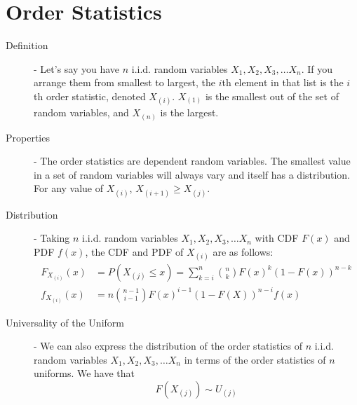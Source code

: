 \documentclass[11pt]{article}
\theoremstyle{definition}
\theoremstyle{remark}
\begin{document}
\section{Order Statistics}
\begin{description}
	\item[Definition] - Let's say you have $n$ i.i.d. random variables $X_1, X_2, X_3, \dots X_n$. If you arrange them from smallest to largest, the $i$th element in that list is the $i$th order statistic, denoted $X_{(i)}$. $X_{(1)}$ is the smallest out of the set of random variables, and $X_{(n)}$ is the largest.
	\item[Properties] - The order statistics are dependent random variables. The smallest value in a set of random variables will always vary and itself has a distribution. For any value of $X_{(i)}$, $X_{(i+1)} \geq X_{(j)}$.
	\item[Distribution] - Taking $n$ i.i.d. random variables $X_1, X_2, X_3, \dots X_n$ with CDF $F(x)$ and PDF $f(x)$, the CDF and PDF of $X_{(i)}$ are as follows:
	\begin{align*}
		F_{X_{(i)}}(x) &= P (X_{(j)} \leq x) = \sum_{k=i}^n {n \choose k} F(x)^k(1 - F(x))^{n - k} \\
		f_{X_{(i)}}(x) &= n{n - 1 \choose i - 1}F(x)^{i-1}(1 - F(X))^{n-i}f(x)
	\end{align*}
	\item[Universality of the Uniform] - We can also express the distribution of the order statistics of $n$  i.i.d. random variables $X_1, X_2, X_3, \dots X_n$ in terms of the order statistics of $n$ uniforms. We have that
	\[F(X_{(j)}) \sim U_{(j)}\]
\end{description}

\pagebreak
\end{document}
